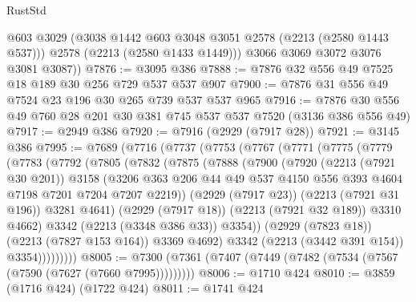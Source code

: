 \begin{lexlean}{RustStd}
\begin{coremodule}
          @603
          @3029
          (@3038 @1442 @603 @3048 @3051 @2578 (@2213 (@2580 @1443 @537)))
          @2578
          (@2213 (@2580 @1433 @1449)))
        @3066
        @3069
        @3072
        @3076
        @3081
        @3087))
@7876 := @3095 @386
@7888 := @7876 @32 @556 @49 @7525 @18 @189 @30 @256 @729 @537 @537 @907
@7900 := @7876 @31 @556 @49 @7524 @23 @196 @30 @265 @739 @537 @537 @965
@7916 := @7876 @30 @556 @49 @760 @28 @201 @30 @381 @745 @537 @537 @7520 (@3136 @386 @556 @49)
@7917 := @2949 @386
@7920 := @7916 (@2929 (@7917 @28))
@7921 := @3145 @386
@7995 := @7689
    (@7716
      (@7737
        (@7753
          (@7767
            (@7771
              (@7775
                (@7779
                  (@7783
                    (@7792
                      (@7805
                        (@7832
                          (@7875
                            (@7888
                              (@7900
                                (@7920
                                  (@2213 (@7921 @30 @201))
                                  @3158
                                  (@3206
                                    @363
                                    @206
                                    @44
                                    @49
                                    @537
                                    @4150
                                    @556
                                    @393
                                    @4604
                                    @7198
                                    @7201
                                    @7204
                                    @7207
                                    @2219))
                                (@2929 (@7917 @23))
                                (@2213 (@7921 @31 @196))
                                @3281
                                @4641)
                              (@2929 (@7917 @18))
                              (@2213 (@7921 @32 @189))
                              @3310
                              @4662)
                            @3342
                            (@2213 (@3348 @386 @33))
                            @3354))
                        (@2929 (@7823 @18))
                        (@2213 (@7827 @153 @164))
                        @3369
                        @4692)
                      @3342
                      (@2213 (@3442 @391 @154))
                      @3354)))))))))
@8005 := @7300 (@7361 (@7407 (@7449 (@7482 (@7534 (@7567 (@7590 (@7627 (@7660 @7995)))))))))
@8006 := @1710 @424
@8010 := @3859 (@1716 @424) (@1722 @424)
@8011 := @1741 @424

\end{coremodule}
\end{lexlean}
